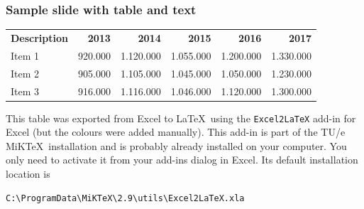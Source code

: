 \documentclass[t,aspectratio=169]{beamer}
\begin{document}
\begin{frame}[fragile]  %
  \frametitle{Sample slide with table and text}
  
  \vspace*{-2ex}
  \begin{center}
    \fontsize{9}{10}\selectfont
    \begin{tabular}{lrrrrr}
      \rowcolor{tuescarlet}
      \color{white}\textbf{Description} & \color{white}\textbf{2013} & \color{white}\textbf{2014} & \color{white}\textbf{2015} & \color{white}\textbf{2016} & \color{white}\textbf{2017} \bigstrut \\
      Item 1                            & 920.000                    & 1.120.000                  & 1.055.000                  & 1.200.000                  & 1.330.000 \bigstrut                  \\
      \hline
      Item 2                            & 905.000                    & 1.105.000                  & 1.045.000                  & 1.050.000                  & 1.230.000 \bigstrut                  \\
      \hline
      Item 3                            & 916.000                    & 1.116.000                  & 1.046.000                  & 1.120.000                  & 1.300.000 \bigstrut[t]               \\
    \end{tabular}%
  \end{center}
  
  This table was exported from Excel to \LaTeX\ using the \verb|Excel2LaTeX| add-in for Excel (but the colours were added manually). This add-in is part of the TU/e MiK\TeX\ installation and is probably already installed on your computer. You only need to activate it from your add-ins dialog in Excel. Its default installation location is
  
  \begin{verbatim}
C:\ProgramData\MiKTeX\2.9\utils\Excel2LaTeX.xla
\end{verbatim}
  
\end{frame}
\end{document}

